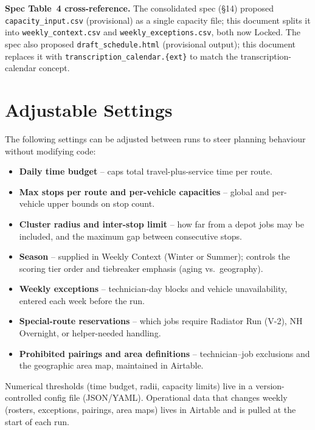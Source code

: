 \documentclass[12pt]{article}
\begin{document}
\noindent\textbf{Spec Table~4 cross-reference.}
The consolidated spec (\S14) proposed \texttt{capacity\_input.csv} (provisional) as a single capacity file; this document splits it into \texttt{weekly\_context.csv} and \texttt{weekly\_exceptions.csv}, both now Locked.
The spec also proposed \texttt{draft\_schedule.html} (provisional output); this document replaces it with \texttt{transcription\_calendar.\{ext\}} to match the transcription-calendar concept.

\section*{Adjustable Settings}

The following settings can be adjusted between runs to steer planning behaviour without modifying code:

\begin{itemize}
    \item \textbf{Daily time budget} -- caps total travel-plus-service time per route.
    \item \textbf{Max stops per route and per-vehicle capacities} -- global and per-vehicle upper bounds on stop count.
    \item \textbf{Cluster radius and inter-stop limit} -- how far from a depot jobs may be included, and the maximum gap between consecutive stops.
    \item \textbf{Season} -- supplied in Weekly Context (Winter or Summer); controls the scoring tier order and tiebreaker emphasis (aging vs.\ geography).
    \item \textbf{Weekly exceptions} -- technician-day blocks and vehicle unavailability, entered each week before the run.
    \item \textbf{Special-route reservations} -- which jobs require Radiator Run (V-2), NH Overnight, or helper-needed handling.
    \item \textbf{Prohibited pairings and area definitions} -- technician--job exclusions and the geographic area map, maintained in Airtable.
\end{itemize}

Numerical thresholds (time budget, radii, capacity limits) live in a version-controlled config file (JSON/YAML).
Operational data that changes weekly (rosters, exceptions, pairings, area maps) lives in Airtable and is pulled at the start of each run.
\end{document}
